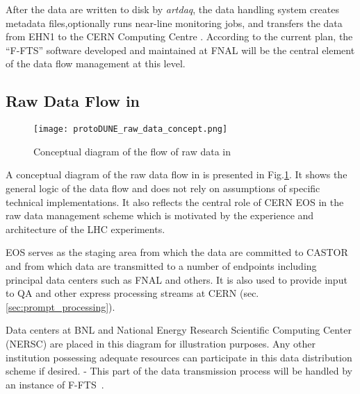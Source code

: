 
After the data are written to disk by {\it artdaq}, the data handling
system creates metadata files,optionally  runs near-line monitoring jobs, and
transfers the data from EHN1 to the CERN Computing Centre \cite{docdb1212}.
According to the current plan,
the ``F-FTS'' software 
developed and maintained at FNAL will be the central element
of the data flow management at this level.


\subsection{Raw Data Flow in \pd}
\label{sec:raw_concept}
\begin{figure}[tbh]
\centering\texttt{[image: protoDUNE\_raw\_data\_concept.png]}
\caption{\label{fig:raw_concept}Conceptual diagram of the flow of raw data in \pd}
\end{figure}

A conceptual diagram of the raw data flow in \pd is presented in Fig.\ref{fig:raw_concept}. It shows the general logic
of the data flow and does not rely on assumptions of specific technical implementations. 
It also reflects the central role of CERN EOS in the \pd raw data management scheme which is motivated by the experience
and architecture of the LHC experiments.

EOS serves as the staging area from which the data are committed to CASTOR
and from which data are transmitted to a number of endpoints including principal data centers such as FNAL and others.
It is also used to provide input to QA and other express processing streams at CERN (sec.\,\ref{sec:prompt_processing}).

Data centers at BNL and National Energy Research Scientific Computing Center (NERSC)
are placed in this diagram for illustration purposes. Any other institution possessing adequate
resources can participate in this data distribution scheme if desired.
-
 This part of the data transmission process will be handled by an instance of F-FTS~\cite{docdb1212}.



